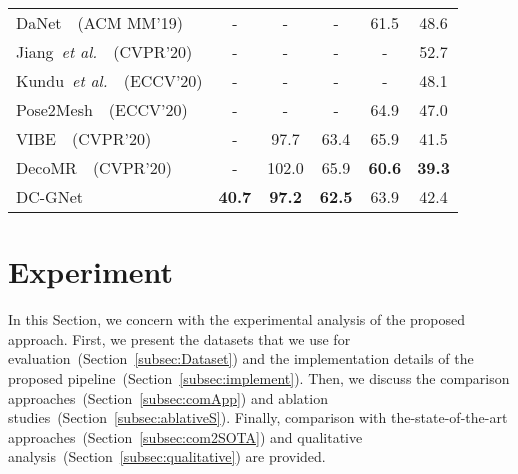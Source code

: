 \documentclass[sigplan]{acmart}
\def\etal{\emph{et al.}}
\begin{document}
\begin{table*}[!t]
{\begin{tabular}{ccccccccccccccccc}
\multicolumn{3}{l|}{DaNet~\cite{acmmm19_danet}~(ACM MM'19)}                   
  & \multicolumn{2}{c}{-}& \multicolumn{3}{c}{-}      & \multicolumn{3}{c|}{-}              & \multicolumn{3}{c}{61.5}      & \multicolumn{3}{c}{48.6}  \\
\multicolumn{3}{l|}{Jiang~\etal~\cite{jiang2020coherent}~(CVPR'20)}               
  & \multicolumn{2}{c}{-}& \multicolumn{3}{c}{-}      & \multicolumn{3}{c|}{-}              & \multicolumn{3}{c}{-}      & \multicolumn{3}{c}{52.7}  \\
\multicolumn{3}{l|}{Kundu~\etal~\cite{kundu_human_mesh}~(ECCV'20)}         
  & \multicolumn{2}{c}{-}& \multicolumn{3}{c}{-}      & \multicolumn{3}{c|}{-}              & \multicolumn{3}{c}{-}      & \multicolumn{3}{c}{48.1}  \\
\multicolumn{3}{l|}{Pose2Mesh~\cite{Choi_2020_ECCV_Pose2Mesh}~(ECCV'20)}         
  & \multicolumn{2}{c}{-}& \multicolumn{3}{c}{-}      & \multicolumn{3}{c|}{-}              & \multicolumn{3}{c}{64.9}      & \multicolumn{3}{c}{47.0}  \\
\multicolumn{3}{l|}{VIBE~\cite{kocabas2019vibe}~(CVPR'20)}                        & \multicolumn{2}{c}{-}  & \multicolumn{3}{c}{97.7}      & \multicolumn{3}{c|}{63.4}              & \multicolumn{3}{c}{{65.9}}      & \multicolumn{3}{c}{{41.5}}  \\
\multicolumn{3}{l|}{DecoMR~\cite{DenseCorrespondence}~(CVPR'20)}                        & \multicolumn{2}{c}{-}  & \multicolumn{3}{c}{102.0}      & \multicolumn{3}{c|}{65.9}              & \multicolumn{3}{c}{\textbf{60.6}}      & \multicolumn{3}{c}{\textbf{39.3}}  \\
\hline
\multicolumn{3}{l|}{DC-GNet}                        & \multicolumn{2}{c}{\textbf{40.7}}  & \multicolumn{3}{c}{\textbf{97.2}}      & \multicolumn{3}{c|}{\textbf{62.5}}              & \multicolumn{3}{c}{63.9}      & \multicolumn{3}{c}{42.4}  \\
\hline
\end{tabular}}
\label{table4All}
\end{table*}
\section{Experiment} 
In this Section, we concern with the experimental analysis of the proposed approach. First, we present the datasets that we use for evaluation~(Section~\ref{subsec:Dataset}) and the implementation details of the proposed pipeline~(Section~\ref{subsec:implement}). Then, we discuss the comparison approaches~(Section~\ref{subsec:comApp}) and ablation studies~(Section~\ref{subsec:ablativeS}). Finally, comparison with the-state-of-the-art approaches~(Section~\ref{subsec:com2SOTA}) and qualitative analysis~(Section~\ref{subsec:qualitative}) are provided.
\end{document}
